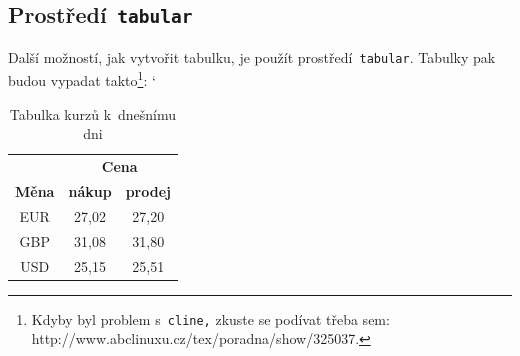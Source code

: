 \documentclass[a4paper, 11pt]{article}
\begin{document}
\subsection{Prostředí\texttt{ tabular}}
Další možností, jak vytvořit tabulku, je použít prostředí\texttt{ tabular}. Tabulky pak
budou vypadat takto\footnote{Kdyby byl problem s\texttt{ cline,} zkuste se podívat třeba sem: http://www.abclinuxu.cz/tex/poradna/show/325037.}:
\bigskip
\catcode`
\begin{table}[h!]
\centering
\begin{tabular}{| c | c | c | }
\hline
 & \multicolumn{2}{c|}{\textbf{Cena}} \\ \cline{2-3} \textbf{Měna} & \textbf{nákup} & \textbf{prodej} \\ \hline
EUR & 27,02 & 27,20 \\
GBP & 31,08 & 31,80 \\
USD & 25,15 & 25,51 \\
\hline
\end{tabular}
\caption{Tabulka kurzů k~dnešnímu dni}\label{kurzy}
\end{table}
\end{document}

